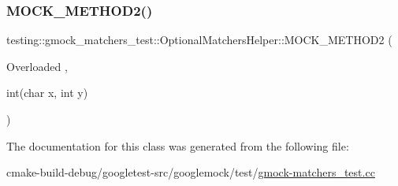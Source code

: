 \subsubsection{\texorpdfstring{MOCK\_METHOD2()}{MOCK\_METHOD2()}\hspace{0.1cm}{\footnotesize\ttfamily [2/2]}}
{\footnotesize\ttfamily testing\+::gmock\+\_\+matchers\+\_\+test\+::\+Optional\+Matchers\+Helper\+::\+M\+O\+C\+K\+\_\+\+M\+E\+T\+H\+O\+D2 (\begin{DoxyParamCaption}\item[{Overloaded}]{,  }\item[{int(char x, int y)}]{ }\end{DoxyParamCaption})}



The documentation for this class was generated from the following file\+:\begin{DoxyCompactItemize}
\item 
cmake-\/build-\/debug/googletest-\/src/googlemock/test/\mbox{\hyperlink{gmock-matchers__test_8cc}{gmock-\/matchers\+\_\+test.\+cc}}\end{DoxyCompactItemize}
